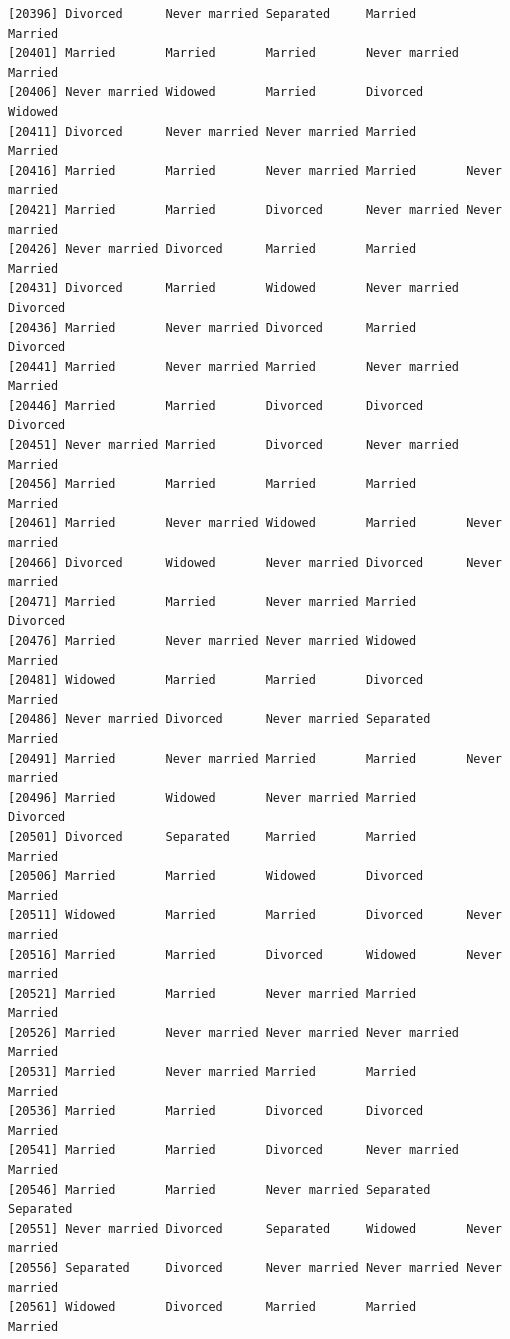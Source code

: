 \documentclass[
  letterpaper,
  DIV=11,
  numbers=noendperiod,
  oneside]{scrartcl}
\begin{document}
\begin{verbatim}
[20396] Divorced      Never married Separated     Married       Married      
[20401] Married       Married       Married       Never married Married      
[20406] Never married Widowed       Married       Divorced      Widowed      
[20411] Divorced      Never married Never married Married       Married      
[20416] Married       Married       Never married Married       Never married
[20421] Married       Married       Divorced      Never married Never married
[20426] Never married Divorced      Married       Married       Married      
[20431] Divorced      Married       Widowed       Never married Divorced     
[20436] Married       Never married Divorced      Married       Divorced     
[20441] Married       Never married Married       Never married Married      
[20446] Married       Married       Divorced      Divorced      Divorced     
[20451] Never married Married       Divorced      Never married Married      
[20456] Married       Married       Married       Married       Married      
[20461] Married       Never married Widowed       Married       Never married
[20466] Divorced      Widowed       Never married Divorced      Never married
[20471] Married       Married       Never married Married       Divorced     
[20476] Married       Never married Never married Widowed       Married      
[20481] Widowed       Married       Married       Divorced      Married      
[20486] Never married Divorced      Never married Separated     Married      
[20491] Married       Never married Married       Married       Never married
[20496] Married       Widowed       Never married Married       Divorced     
[20501] Divorced      Separated     Married       Married       Married      
[20506] Married       Married       Widowed       Divorced      Married      
[20511] Widowed       Married       Married       Divorced      Never married
[20516] Married       Married       Divorced      Widowed       Never married
[20521] Married       Married       Never married Married       Married      
[20526] Married       Never married Never married Never married Married      
[20531] Married       Never married Married       Married       Married      
[20536] Married       Married       Divorced      Divorced      Married      
[20541] Married       Married       Divorced      Never married Married      
[20546] Married       Married       Never married Separated     Separated    
[20551] Never married Divorced      Separated     Widowed       Never married
[20556] Separated     Divorced      Never married Never married Never married
[20561] Widowed       Divorced      Married       Married       Married      

\end{verbatim}
\end{document}
